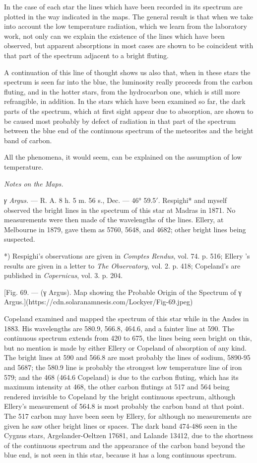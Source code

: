 \documentclass[a4paper, 12pt, oneside, polutonikogreek, english]{article}
\begin{document}
In the case of each star the lines which have been recorded in its spectrum are plotted in the way indicated in the maps. The general result is that when we take into account the low temperature radiation, which we learn from the laboratory work, not only can we explain the existence of the lines which have been observed, but apparent absorptions in most cases are shown to be coincident with that part of the spectrum adjacent to a bright fluting.

A continuation of this line of thought shows us also that, when in these stars the spectrum is seen far into the blue, the luminosity really proceeds from the carbon fluting, and in the hotter stars, from the hydrocarbon one, which is still more refrangible, in addition. In the stars which have been examined so far, the dark parts of the spectrum, which at first sight appear due to absorption, are shown to be caused most probably by defect of radiation in that part of the spectrum between the blue end of the continuous spectrum of the meteorites and the bright band of carbon.

All the phenomena, it would seem, can be explained on the assumption of low temperature.

\emph{Notes on the Maps.}

\emph{γ Argus.} --- R. A. 8 h. 5 m. 56 s., Dec. --- 46° 59.5$\prime$. Respighi* and myself observed the bright lines in the spectrum of this star at Madras in 1871. No measurements were then made of the wavelengths of the lines. Ellery, at Melbourne in 1879, gave them as 5760, 5648, and 4682; other bright lines being suspected.

*) Respighi's observations are given in \emph{Comptes Rendus}, vol. 74. p. 516; Ellery 's results are given in a letter to \emph{The Observatory}, vol. 2. p. 418; Copeland's are published in \emph{Copernicus}, vol. 3. p. 204.

[Fig. 69. --- (γ Argus). Map showing the Probable Origin of the Spectrum of γ Argus.](https://cdn.solaranamnesis.com/Lockyer/Fig-69.jpeg)

Copeland examined and mapped the spectrum of this star while in the Andes in 1883. His wavelengths are 580.9, 566.8, 464.6, and a fainter line at 590. The continuous spectrum extends from 420 to 675, the lines being seen bright on this, but no mention is made by either Ellery or Copeland of absorption of any kind. The bright lines at 590 and 566.8 are most probably the lines of sodium, 5890-95 and 5687; the 580.9 line is probably the strongest low temperature line of iron 579; and the 468 (464.6 Copeland) is due to the carbon fluting, which has its maximum intensity at 468, the other carbon flutings at 517 and 564 being rendered invisible to Copeland by the bright continuous spectrum, although Ellery's measurement of 564.8 is most probably the carbon band at that point. The 517 carbon may have been seen by Ellery, for although no measurements are given he saw other bright lines or spaces. The dark band 474-486 seen in the Cygnus stars, Argelander-Oeltzen 17681, and Lalande 13412, due to the shortness of the continuous spectrum and the appearance of the carbon band beyond the blue end, is not seen in this star, because it has a long continuous spectrum.
\end{document}
